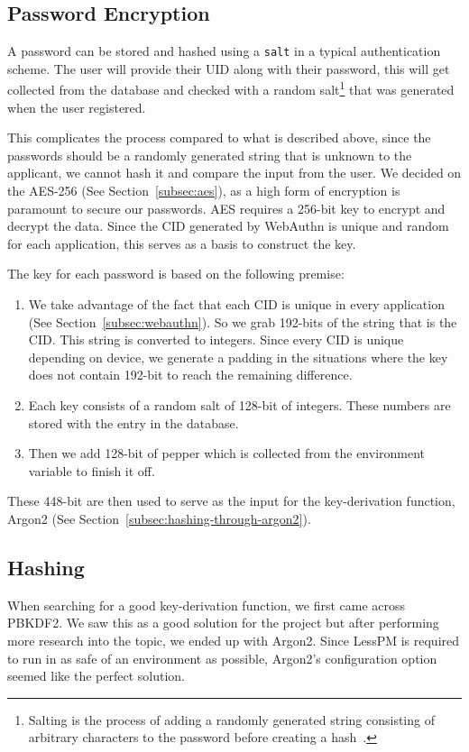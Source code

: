 \subsection{Password Encryption}\label{subsec:password-encryption}
A password can be stored and hashed using a \texttt{salt} in a typical
authentication scheme.
The user will provide their UID along with their password, this will get
collected from the database and checked with a random salt\footnote{
  Salting is the process of adding a randomly generated string consisting of
  arbitrary characters to the password before creating a hash~\cite{
    Kharod2015}.
} that was generated when the user registered.

This complicates the process compared to what is described above, since
the passwords should be a randomly generated string that is unknown to the
applicant, we cannot hash it and compare the input from the user.
We decided on the AES-256 (See Section~\ref{subsec:aes}), as a high form of
encryption is paramount to secure our passwords.
AES requires a 256-bit key to encrypt and decrypt the data.
Since the CID generated by WebAuthn is unique and random for each application,
this serves as a basis to construct the key.

The key for each password is based on the following premise:
\begin{enumerate}
  \item
  We take advantage of the fact that each CID is unique in every
  application (See Section~\ref{subsec:webauthn}). So we grab 192-bits of the
  string that is the CID\@.
  This string is converted to integers.
  Since every CID is unique depending on device, we generate a padding in the
  situations where the key does not contain 192-bit to reach the remaining
  difference.
  \item
  Each key consists of a random salt of 128-bit of integers.
  These numbers are stored with the entry in the database.
  \item
  Then we add 128-bit of pepper which is collected from the environment
  variable to finish it off.
\end{enumerate}
These 448-bit are then used to serve as the input for the key-derivation
function, Argon2 (See Section~\ref{subsec:hashing-through-argon2}).

\subsection{Hashing}\label{subsec:hashing}
When searching for a good key-derivation function, we first came across PBKDF2.
We saw this as a good solution for the project but after performing more
research into the topic, we ended up with Argon2.
Since LessPM is required to run in as safe of an environment as possible,
Argon2's configuration option seemed like the perfect solution.

